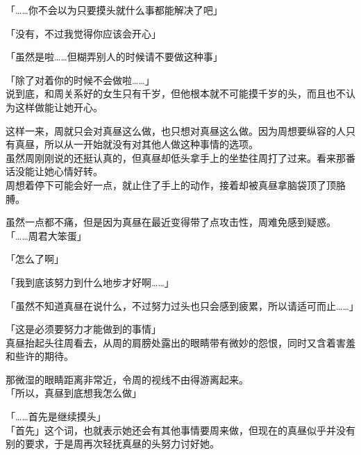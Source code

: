 「……你不会以为只要摸头就什么事都能解决了吧」

「没有，不过我觉得你应该会开心」

「虽然是啦……但糊弄别人的时候请不要做这种事」

「除了对着你的时候不会做啦……」\\

说到底，和周关系好的女生只有千岁，但他根本就不可能摸千岁的头，而且也不认为这样做能让她开心。

这样一来，周就只会对真昼这么做，也只想对真昼这么做。因为周想要纵容的人只有真昼，所以从一开始就没有对其他人做这种事情的选项。\\

虽然周刚刚说的还挺认真的，但真昼却低头拿手上的坐垫往周打了过来。看来那番话没能让她心情好转。\\

周想着停下可能会好一点，就止住了手上的动作，接着却被真昼拿脑袋顶了顶胳膊。

虽然一点都不痛，但是因为真昼在最近变得带了点攻击性，周难免感到疑惑。\\

「……周君大笨蛋」

「怎么了啊」

「我到底该努力到什么地步才好啊……」

「虽然不知道真昼在说什么，不过努力过头也只会感到疲累，所以请适可而止……」

「这是必须要努力才能做到的事情」\\

真昼抬起头往周看去，从周的肩膀处露出的眼睛带有微妙的怨恨，同时又含着害羞和些许的期待。

那微湿的眼睛距离非常近，令周的视线不由得游离起来。\\

「所以，真昼到底想我怎么做」

「……首先是继续摸头」\\

「首先」这个词，也就表示她还会有其他事情要周来做，但现在的真昼似乎并没有别的要求，于是周再次轻抚真昼的头努力讨好她。
